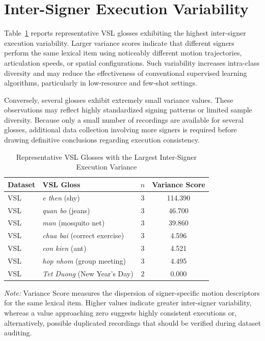 \documentclass{ieeeaccess}
\begin{document}
\section{Inter-Signer Execution Variability}

Table~\ref{tab:app_signer} reports representative VSL glosses exhibiting the highest inter-signer execution variability. Larger variance scores indicate that different signers perform the same lexical item using noticeably different motion trajectories, articulation speeds, or spatial configurations. Such variability increases intra-class diversity and may reduce the effectiveness of conventional supervised learning algorithms, particularly in low-resource and few-shot settings.

Conversely, several glosses exhibit extremely small variance values. These observations may reflect highly standardized signing patterns or limited sample diversity. Because only a small number of recordings are available for several glosses, additional data collection involving more signers is required before drawing definitive conclusions regarding execution consistency.

\begin{table}[!t]
\caption{Representative VSL Glosses with the Largest Inter-Signer Execution Variance}
\label{tab:app_signer}

\centering
\small
\setlength{\tabcolsep}{6pt}

\begin{tabular}{llcc}
\toprule
\textbf{Dataset} &
\textbf{VSL Gloss} &
\textbf{$n$} &
\textbf{Variance Score} \\
\midrule

VSL &
\textit{e then} (shy) &
3 &
114.390 \\

VSL &
\textit{quan bo} (jeans) &
3 &
46.700 \\

VSL &
\textit{man} (mosquito net) &
3 &
39.860 \\

VSL &
\textit{chua bai} (correct exercise) &
3 &
4.596 \\

VSL &
\textit{con kien} (ant) &
3 &
4.521 \\

VSL &
\textit{hop nhom} (group meeting) &
3 &
4.495 \\

VSL &
\textit{Tet Duong} (New Year's Day) &
2 &
0.000 \\

\bottomrule
\end{tabular}

\vspace{2mm}

\footnotesize
\textit{Note:}
Variance Score measures the dispersion of signer-specific motion descriptors for the same lexical item.
Higher values indicate greater inter-signer variability, whereas a value approaching zero suggests highly consistent executions or, alternatively, possible duplicated recordings that should be verified during dataset auditing.

\end{table}
\end{document}
